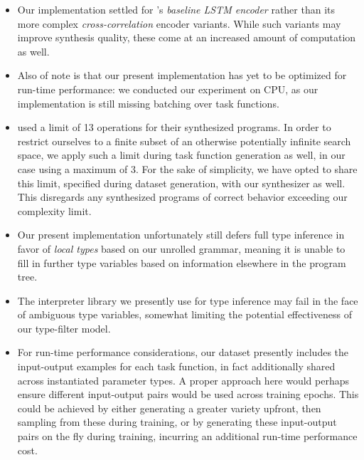 \documentclass{article}
\begin{document}
\begin{itemize}
    \item
    Our implementation settled for \citet{nsps}'s \emph{baseline LSTM encoder} rather than its more complex \emph{cross-correlation} encoder variants.
    While such variants may improve synthesis quality,
    these come at an increased amount of computation as well.

    \item
    Also of note is that our present implementation has yet to be optimized for run-time performance:
    we conducted our experiment on CPU,
    as our implementation is still missing batching over task functions.

    \item
    \citet{nsps} used a limit of 13 operations for their synthesized programs.
    In order to restrict ourselves to a finite subset of an otherwise potentially infinite search space,
    we apply such a limit during task function generation as well, in our case using a maximum of 3.
    For the sake of simplicity, we have opted to share this limit,
    specified during dataset generation, with our synthesizer as well.
    This disregards any synthesized programs of
    correct behavior exceeding our complexity limit.


    \item
    Our present implementation unfortunately still defers full type inference in favor of \emph{local types} based on our unrolled grammar,
    meaning it is unable to fill in further type variables based on information elsewhere in the program tree.

    \item
    The interpreter library we presently use for type inference may fail in the face of ambiguous type variables,
    somewhat limiting the potential effectiveness of our type-filter model.

    \item
    For run-time performance considerations,
    our dataset presently includes the input-output examples for each task function,
    in fact additionally shared across instantiated parameter types.
    A proper approach here would perhaps ensure different input-output pairs would be used across training epochs.
    This could be achieved by either generating a greater variety upfront,
    then sampling from these during training, or by generating these input-output pairs on the fly during training,
    incurring an additional run-time performance cost.


\end{itemize}
\end{document}
